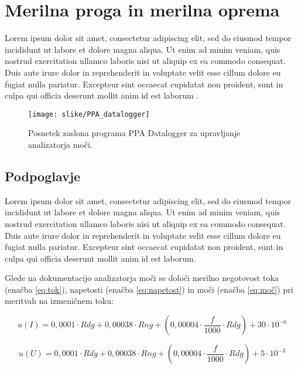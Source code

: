 \pagebreak

\section{Merilna proga in merilna oprema}
Lorem ipsum dolor sit amet, consectetur adipiscing elit, sed do eiusmod tempor incididunt ut labore et dolore magna aliqua. Ut enim ad minim veniam, quis nostrud exercitation ullamco laboris nisi ut aliquip ex ea commodo consequat. Duis aute irure dolor in reprehenderit in voluptate velit esse cillum dolore eu fugiat nulla pariatur. Excepteur sint occaecat cupidatat non proident, sunt in culpa qui officia deserunt mollit anim id est laborum \cite{EN_60436}. 

\begin{figure}[h]
\centering
\texttt{[image: slike/PPA\_datalogger]}
\caption{Posnetek zaslona programa PPA Datalogger za upravljanje analizatorja moči.}\label{fig:PPA_datalogger}
\end{figure}

\subsection{Podpoglavje}\label{}
Lorem ipsum dolor sit amet, consectetur adipiscing elit, sed do eiusmod tempor incididunt ut labore et dolore magna aliqua. Ut enim ad minim veniam, quis nostrud exercitation ullamco laboris nisi ut aliquip ex ea commodo consequat. Duis aute irure dolor in reprehenderit in voluptate velit esse cillum dolore eu fugiat nulla pariatur. Excepteur sint occaecat cupidatat non proident, sunt in culpa qui officia deserunt mollit anim id est laborum.

Glede na dokumentacijo analizatorja moči \cite{PPA_manual} se določi merilno negotovost toka (enačba \ref{eq:tok}), napetosti (enačba \ref{eq:napetost}) in moči (enačba \ref{eq:moč}) pri meritvah na izmeničnem toku:

\begin{equation}\label{eq:tok}
u(I) = 0,0001 \cdot Rdg + 0,00038 \cdot Rng + \left(0,00004 \cdot \frac{f}{1000} \cdot Rdg \right) + 30 \cdot 10^{-6}
\end{equation}

\begin{equation}\label{eq:napetost}
u(U) = 0,0001 \cdot Rdg + 0,00038 \cdot Rng + \left(0,00004 \cdot \frac{f}{1000} \cdot Rdg \right) + 5 \cdot 10^{-3}
\end{equation}


